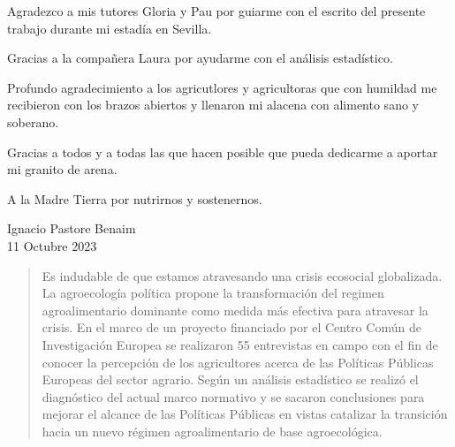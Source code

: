\documentclass[a4paper, nobind]{templates/ociamthesis}
\begin{document}
\begin{romanpages}

\maketitle




\begin{acknowledgements}
 	\centering

 \vspace{30mm}

 Agradezco a mis tutores Gloria y Pau por guiarme con el escrito del presente trabajo durante mi estadía en Sevilla.

 \vspace{10mm}

 Gracias a la compañera Laura por ayudarme con el análisis estadístico.

 \vspace{10mm}

 Profundo agradecimiento a los agricutlores y agricultoras que con humildad me recibieron con los brazos abiertos y llenaron mi alacena con alimento sano y soberano.

 \vspace{10mm}

 Gracias a todos y a todas las que hacen posible que pueda dedicarme a aportar mi granito de arena.

 \vspace{10mm}

 A la Madre Tierra por nutrirnos y sostenernos.

 \vfill

 \begin{flushright}
 Ignacio Pastore Benaim \\
 11 Octubre 2023
 \end{flushright}
\end{acknowledgements}





\renewcommand{\abstracttitle}{Resumen}
\begin{abstract}
	\setlength{\baselineskip}{30pt}

Es indudable de que estamos atravesando una crisis ecosocial globalizada. La agroecología política propone la transformación del regimen agroalimentario dominante como medida más efectiva para atravesar la crisis. En el marco de un proyecto financiado por el Centro Común de Investigación Europea se realizaron 55 entrevistas en campo con el fin de conocer la percepción de los agricultores acerca de las Políticas Públicas Europeas del sector agrario. Según un análisis estadístico se realizó el diagnóstico del actual marco normativo y se sacaron conclusiones para mejorar el alcance de las Políticas Públicas en vistas catalizar la transición hacia un nuevo régimen agroalimentario de base agroecológica.
\end{abstract}



\end{romanpages}
\end{document}
